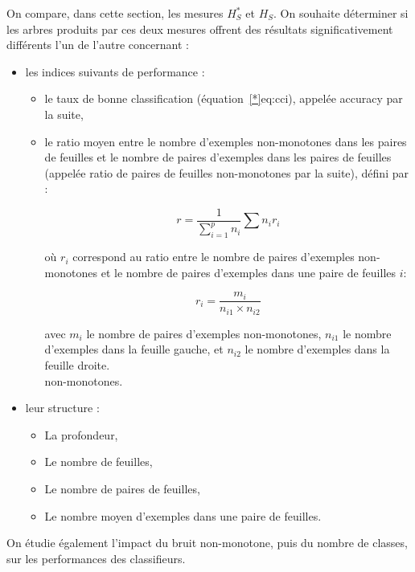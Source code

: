 \documentclass[a4paper]{article}
\renewcommand{\eqref}[1]{équation~\ref{#1}}
\begin{document}
On compare, dans cette section, les mesures $H^*_S$ et $H_S$. On souhaite
déterminer si les arbres produits par ces deux mesures offrent des résultats
significativement différents l'un de l'autre concernant :

\begin{itemize}
    \item les indices suivants de performance : 
    \begin{itemize}
        \item le taux de bonne classification (\eqref*{eq:cci}), appelée accuracy
        par la suite,
       
        \item le ratio moyen entre le nombre d'exemples non-monotones dans les
            paires de feuilles et le nombre de paires d'exemples dans les paires
            de feuilles (appelée ratio de paires de feuilles non-monotones par
            la suite), défini par :

        \begin{equation}
            r = \frac{1}{\sum_{i=1}^{p} n_i} \sum{n_i}{r_i}
        \label{eq:ratio}
        \end{equation}

        où $r_i$ correspond au ratio entre le nombre de paires d'exemples
            non-monotones et le nombre de paires d'exemples dans une paire de
            feuilles $i$:

            $$r_i = \frac{m_i}{n_{i1} \times n_{i2}}$$

        avec $m_i$ le nombre de paires d'exemples non-monotones, $n_{i1}$ le
    nombre d'exemples dans la feuille gauche, et $n_{i2}$ le nombre d'exemples
    dans la feuille droite. \\ non-monotones. 
        \end{itemize}
    \item leur structure :
    \begin{itemize}
        \item La profondeur,
        \item Le nombre de feuilles,
        \item Le nombre de paires de feuilles,
        \item Le nombre moyen d'exemples dans une paire de feuilles.
    \end{itemize}
    
\end{itemize}

On étudie également l'impact du bruit non-monotone, puis du nombre de classes, sur
les performances des classifieurs. \\
\end{document}
